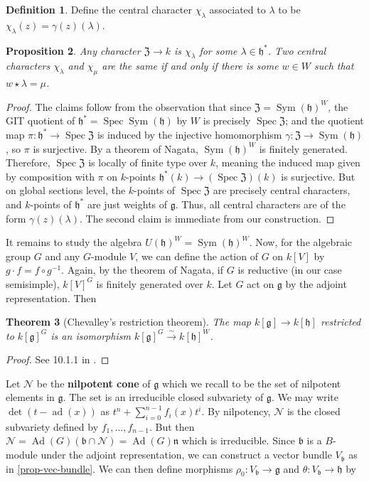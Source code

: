 \documentclass[11pt, a4paper]{article}
\newtheorem{theorem}{Theorem}[subsection]
\newtheorem{proposition}[theorem]{Proposition}
\theoremstyle{definition}
\newtheorem{definition}[theorem]{Definition}
\newcommand{\Spec}[0]{\operatorname{Spec}}
\newcommand{\Sym}[0]{\operatorname{Sym}}
\newcommand{\ad}{\operatorname{ad}}
\newcommand{\h}{\mathfrak h}
\newcommand{\g}{\mathfrak g}
\begin{document}
    \begin{definition}
        Define the central character $\chi_\lambda$ associated to $\lambda$ to be $\chi_\lambda(z)=\gamma(z)(\lambda)$.
    \end{definition}
    \begin{proposition}\label{prop-hc-char}
        Any character $\mathfrak Z\to k$ is $\chi_\lambda$ for some $\lambda\in\h^*$. Two central characters $\chi_\lambda$ and $\chi_\mu$ are the same if and only if there is some $w\in W$ such that $w\star\lambda=\mu$.
    \end{proposition}
    \begin{proof}
        The claims follow from the observation that since $\mathfrak Z=\Sym(\h)^W$, the GIT quotient of $\h^*=\Spec\Sym(\h)$ by $W$ is precisely $\Spec \mathfrak Z$; and the quotient map $\pi:\h^*\to \Spec \mathfrak Z$ is induced by the injective homomorphism $\gamma:\mathfrak Z\to \Sym(\h)$, so $\pi$ is surjective. By a theorem of Nagata, $\Sym(\h)^W$ is finitely generated. Therefore, $\Spec \mathfrak Z$ is locally of finite type over $k$, meaning the induced map given by composition with $\pi$ on $k$-points $\h^*(k)\to(\Spec \mathfrak Z)(k)$ is surjective. But on global sections level, the $k$-points of $\Spec \mathfrak Z$ are precisely central characters, and $k$-points of $\h^*$ are just weights of $\g$. Thus, all central characters are of the form $\gamma(z)(\lambda)$. The second claim is immediate from our construction.
    \end{proof}
    It remains to study the algebra $U(\h)^W=\Sym(\h)^W$. Now, for the algebraic group $G$ and any $G$-module $V$, we can define the action of $G$ on $k[V]$ by $g\cdot f=f\circ g^{-1}$. Again, by the theorem of Nagata, if $G$ is reductive (in our case semisimple), $k[V]^G$ is finitely generated over $k$. Let $G$ act on $\g$ by the adjoint representation. Then
    \begin{theorem}[Chevalley's restriction theorem]
        The map $k[\g]\to k[\h]$ restricted to $k[\g]^G$ is an isomorphism $k[\g]^G\xrightarrow{\sim}k[\h]^W$.
    \end{theorem}
    \begin{proof}
        See 10.1.1 in \cite{htt-d-modules}.
    \end{proof}
    Let $\mathscr N$ be the \textbf{nilpotent cone} of $\g$ which we recall to be the set of nilpotent elements in $\g$. The set is an irreducible closed subvariety of $\g$. We may write $\det(t-\ad(x))$ as $t^n+\sum_{i=0}^{n-1}f_i(x)t^i$. By nilpotency, $\mathscr N$ is the closed subvariety defined by $f_1,\dots, f_{n-1}$. But then $\mathscr N=\operatorname{Ad}(G)(\mathfrak b\cap\mathscr N)=\operatorname{Ad}(G)\mathfrak n$ which is irreducible. Since $\mathfrak b$ is a $B$-module under the adjoint representation, we can construct a vector bundle $V_{\mathfrak b}$ as in \cref{prop-vec-bundle}. We can then define morphisms $\rho_0:V_{\mathfrak b}\to\g$ and $\theta:V_{\mathfrak b}\to\h$ by
\end{document}
